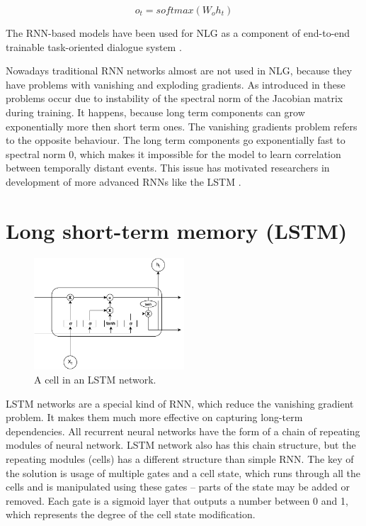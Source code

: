 \begin{equation} \label{eq:rnn_o}
o_t = softmax(W_oh_t)
\end{equation}

The RNN-based models have been used for NLG as a component of end-to-end trainable task-oriented dialogue system \cite{wen2016network}. 

Nowadays traditional RNN networks almost are not used in NLG, because they have problems with vanishing and exploding gradients. As introduced in \cite{bengio1994learning} these problems occur due to instability of the spectral norm of the Jacobian matrix during training. It happens, because long term components can grow exponentially more then short term ones. The vanishing gradients problem refers to the opposite behaviour. The long term components go exponentially fast to spectral norm 0, which makes it impossible for the model to learn correlation between temporally distant events. This issue has motivated researchers in development of more advanced RNNs like the LSTM \cite{hochreiter1997long}.

\section{Long short-term memory (LSTM)} \label{lstm_section}

\begin{figure}[hbt]
  \centering
  \includegraphics[width=0.5\textwidth]{figures/lstmCell.pdf}
  \caption{A cell in an LSTM network.}
  \label{lstm}
\end{figure}

LSTM networks are a special kind of RNN, which reduce the vanishing gradient problem. It makes them much more effective on capturing long-term dependencies. All recurrent neural networks have the form of a chain of repeating modules of neural network. LSTM network also has this chain structure, but the repeating modules (cells) has a different structure than simple RNN. The key of the solution is usage of multiple gates and a cell state, which runs through all the cells and is manipulated using these gates – parts of the state may be added or removed. Each gate is a sigmoid layer that outputs a number between 0 and 1, which represents the degree of the cell state modification.


